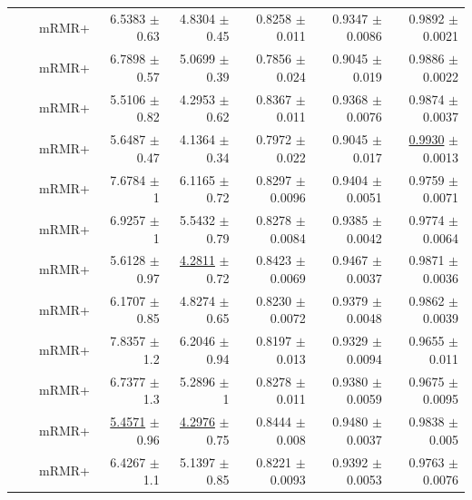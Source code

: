 \begin{longtable}{llp{}rrrrr}
 &  & mRMR+ & 6.5383 {\scriptsize $\pm$ 0.63} & 4.8304 {\scriptsize $\pm$ 0.45} & 0.8258 {\scriptsize $\pm$ 0.011} & 0.9347 {\scriptsize $\pm$ 0.0086} & 0.9892 {\scriptsize $\pm$ 0.0021} \\
 &  & mRMR+ & 6.7898 {\scriptsize $\pm$ 0.57} & 5.0699 {\scriptsize $\pm$ 0.39} & 0.7856 {\scriptsize $\pm$ 0.024} & 0.9045 {\scriptsize $\pm$ 0.019} & 0.9886 {\scriptsize $\pm$ 0.0022} \\
 &  & mRMR+ & 5.5106 {\scriptsize $\pm$ 0.82} & 4.2953 {\scriptsize $\pm$ 0.62} & 0.8367 {\scriptsize $\pm$ 0.011} & 0.9368 {\scriptsize $\pm$ 0.0076} & 0.9874 {\scriptsize $\pm$ 0.0037} \\
 &  & mRMR+ & 5.6487 {\scriptsize $\pm$ 0.47} & 4.1364 {\scriptsize $\pm$ 0.34} & 0.7972 {\scriptsize $\pm$ 0.022} & 0.9045 {\scriptsize $\pm$ 0.017} & \underline{0.9930} {\scriptsize $\pm$ 0.0013} \\
 &  & mRMR+ & 7.6784 {\scriptsize $\pm$ 1} & 6.1165 {\scriptsize $\pm$ 0.72} & 0.8297 {\scriptsize $\pm$ 0.0096} & 0.9404 {\scriptsize $\pm$ 0.0051} & 0.9759 {\scriptsize $\pm$ 0.0071} \\
 &  & mRMR+ & 6.9257 {\scriptsize $\pm$ 1} & 5.5432 {\scriptsize $\pm$ 0.79} & 0.8278 {\scriptsize $\pm$ 0.0084} & 0.9385 {\scriptsize $\pm$ 0.0042} & 0.9774 {\scriptsize $\pm$ 0.0064} \\
 &  & mRMR+ & 5.6128 {\scriptsize $\pm$ 0.97} & \underline{4.2811} {\scriptsize $\pm$ 0.72} & 0.8423 {\scriptsize $\pm$ 0.0069} & 0.9467 {\scriptsize $\pm$ 0.0037} & 0.9871 {\scriptsize $\pm$ 0.0036} \\
 &  & mRMR+ & 6.1707 {\scriptsize $\pm$ 0.85} & 4.8274 {\scriptsize $\pm$ 0.65} & 0.8230 {\scriptsize $\pm$ 0.0072} & 0.9379 {\scriptsize $\pm$ 0.0048} & 0.9862 {\scriptsize $\pm$ 0.0039} \\
 &  & mRMR+ & 7.8357 {\scriptsize $\pm$ 1.2} & 6.2046 {\scriptsize $\pm$ 0.94} & 0.8197 {\scriptsize $\pm$ 0.013} & 0.9329 {\scriptsize $\pm$ 0.0094} & 0.9655 {\scriptsize $\pm$ 0.011} \\
 &  & mRMR+ & 6.7377 {\scriptsize $\pm$ 1.3} & 5.2896 {\scriptsize $\pm$ 1} & 0.8278 {\scriptsize $\pm$ 0.011} & 0.9380 {\scriptsize $\pm$ 0.0059} & 0.9675 {\scriptsize $\pm$ 0.0095} \\
 &  & mRMR+ & \underline{5.4571} {\scriptsize $\pm$ 0.96} & \underline{4.2976} {\scriptsize $\pm$ 0.75} & 0.8444 {\scriptsize $\pm$ 0.008} & 0.9480 {\scriptsize $\pm$ 0.0037} & 0.9838 {\scriptsize $\pm$ 0.005} \\
 &  & mRMR+ & 6.4267 {\scriptsize $\pm$ 1.1} & 5.1397 {\scriptsize $\pm$ 0.85} & 0.8221 {\scriptsize $\pm$ 0.0093} & 0.9392 {\scriptsize $\pm$ 0.0053} & 0.9763 {\scriptsize $\pm$ 0.0076} \\

\end{longtable}
